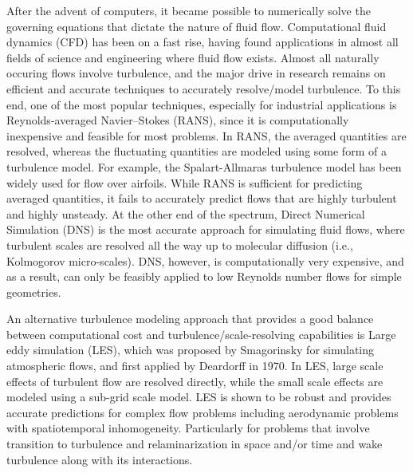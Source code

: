 After the advent of computers, it became possible to numerically solve the governing equations that dictate the nature of fluid flow.
Computational fluid dynamics (CFD) has been on a fast rise, having found applications in almost all fields of science and engineering where fluid flow exists.
Almost all naturally occuring flows involve turbulence, and the major drive in research remains on efficient and accurate techniques to accurately resolve/model turbulence.
To this end, one of the most popular techniques, especially for industrial applications is Reynolds-averaged Navier–Stokes (RANS), since it is computationally inexpensive and feasible for most problems.
In RANS, the averaged quantities are resolved, whereas the fluctuating quantities are modeled using some form of a turbulence model. For example, the Spalart-Allmaras turbulence model \cite{bib:Spalart} has been widely used for flow over airfoils.
While RANS is sufficient for predicting averaged quantities, it fails to accurately predict flows that are highly turbulent and highly unsteady.
At the other end of the spectrum, Direct Numerical Simulation (DNS) is the most accurate approach for simulating fluid flows, where turbulent scales are resolved all the way up to molecular diffusion (i.e., Kolmogorov micro-scales).
DNS, however, is computationally very expensive, and as a result, can only be feasibly applied to low Reynolds number flows for simple geometries.

An alternative turbulence modeling approach that provides a good balance between computational cost and turbulence/scale-resolving capabilities is Large eddy simulation (LES), which was proposed by Smagorinsky \cite{bib:smag} for simulating atmospheric flows, and first applied by Deardorff \cite{bib:deardorff1970} in 1970.
In LES, large scale effects of turbulent flow are resolved directly, while the small scale effects are modeled using a sub-grid scale model.
LES is shown to be robust and provides accurate predictions for complex flow problems including aerodynamic problems with spatiotemporal inhomogeneity. Particularly for problems that involve transition to turbulence and relaminarization in space and/or time and wake turbulence along with its interactions.

